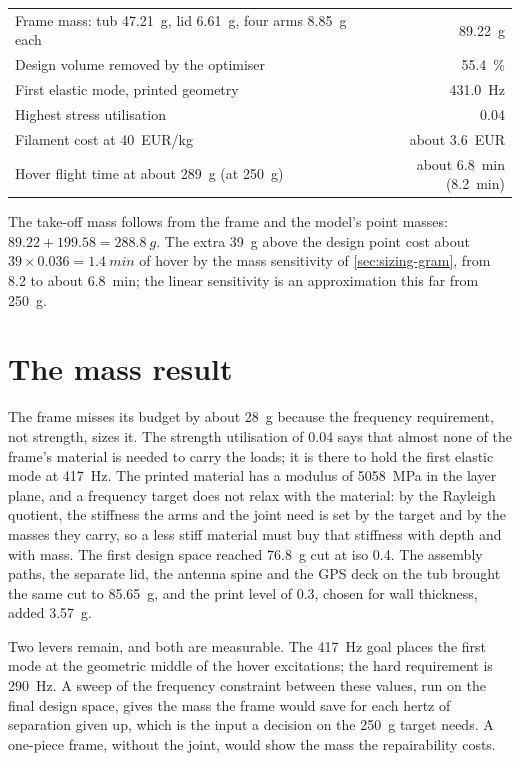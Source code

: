 \begin{keybox}
\small
\begin{tabularx}{\linewidth}{@{}Xr@{}}
Frame mass: tub \SI{47.21}{g}, lid \SI{6.61}{g}, four arms \SI{8.85}{g} each & \SI{89.22}{g}\\
Design volume removed by the optimiser & \SI{55.4}{\percent}\\
First elastic mode, printed geometry & \SI{431.0}{Hz}\\
Highest stress utilisation & 0.04\\
Filament cost at \SI{40}{EUR/kg} & about \SI{3.6}{EUR}\\
Hover flight time at about \SI{289}{g} (at \SI{250}{g}) & about \SI{6.8}{min} (\SI{8.2}{min})\\
\end{tabularx}
\end{keybox}

The take-off mass follows from the frame and the model's point masses: $89.22 + 199.58 = \SI{288.8}{g}$. The extra \SI{39}{g} above the design point cost about $39 \times 0.036 = \SI{1.4}{min}$ of hover by the mass sensitivity of \cref{sec:sizing-gram}, from 8.2 to about \SI{6.8}{min}; the linear sensitivity is an approximation this far from \SI{250}{g}.

\section{The mass result}\label{sec:res-mass}

The frame misses its budget by about \SI{28}{g} because the frequency requirement, not strength, sizes it. The strength utilisation of 0.04 says that almost none of the frame's material is needed to carry the loads; it is there to hold the first elastic mode at \SI{417}{Hz}. The printed material has a modulus of \SI{5058}{MPa} in the layer plane, and a frequency target does not relax with the material: by the Rayleigh quotient, the stiffness the arms and the joint need is set by the target and by the masses they carry, so a less stiff material must buy that stiffness with depth and with mass. The first design space reached \SI{76.8}{g} cut at iso 0.4. The assembly paths, the separate lid, the antenna spine and the GPS deck on the tub brought the same cut to \SI{85.65}{g}, and the print level of 0.3, chosen for wall thickness, added \SI{3.57}{g}.

Two levers remain, and both are measurable. The \SI{417}{Hz} goal places the first mode at the geometric middle of the hover excitations; the hard requirement is \SI{290}{Hz}. A sweep of the frequency constraint between these values, run on the final design space, gives the mass the frame would save for each hertz of separation given up, which is the input a decision on the \SI{250}{g} target needs. A one-piece frame, without the joint, would show the mass the repairability costs.

